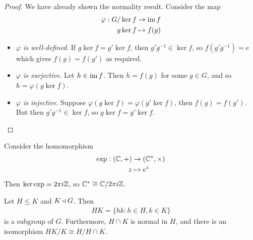 \documentclass{../template/note}
\begin{document}
    \begin{proof}
        We have already shown the normality result. Consider the map
        \begin{align*}
            \varphi: G/\ker f &\to \operatorname{im} f \\
            g\ker f &\mapsto f(g)
        \end{align*}
        \begin{itemize}
            \item \emph{$\varphi$ is well-defined}. If $g \ker f = g'\ker f$, then $g'g^{-1} \in \ker f$, so $f(g'g^{-1})= e$ which gives $f(g) = f(g')$ as required.
            \item \emph{$\varphi$ is surjective}. Let $h \in \operatorname{im} f$. Then $h = f(g)$ for some $g \in G$, and so $h = \varphi(g \ker f)$.
            \item \emph{$\varphi$ is injective}. Suppose $\varphi(g \ker f) = \varphi(g' \ker f)$, then $f(g) = f(g')$. But then $g'g^{-1} \in \ker f$, so $g \ker f = g' \ker f$.
        \end{itemize}
    \end{proof}
    
    \begin{example*}
        Consider the homomorphism
        \begin{align*}
            \exp: (\mathbb C, +) &\to (\mathbb C^*, \times) \\
            z &\mapsto e^z
        \end{align*}
        Then $\ker \exp = 2\pi i\mathbb Z$, so $\mathbb C^* \cong \mathbb C/2\pi i \mathbb Z$.
    \end{example*}
    
    \begin{theorem}
        Let $H \leq K$ and $K \triangleleft G$. Then
        \begin{align*}
            HK = \{hk : h \in H, k \in K\}
        \end{align*}
        is a subgroup of $G$. Furthermore, $H \cap K$ is normal in $H$, and there is an isomorphism $HK/K \cong H/H \cap K$.
    \end{theorem}
    
\end{document}
